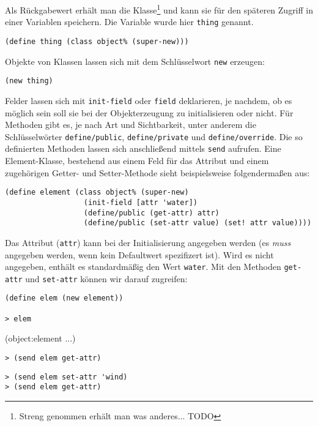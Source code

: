 Als Rückgabewert erhält man die Klasse\footnote{Streng genommen erhält man was anderes... TODO} %
und kann sie für den späteren Zugriff in einer Variablen speichern. Die Variable wurde hier \texttt{thing} genannt.

\begin{lstlisting}
(define thing (class object% (super-new)))
\end{lstlisting}

Objekte von Klassen lassen sich mit dem Schlüsselwort \texttt{new} erzeugen:

\begin{lstlisting}
(new thing)
\end{lstlisting}

Felder lassen sich mit \texttt{init-field} oder \texttt{field} deklarieren, je nachdem, ob es möglich sein soll sie bei der Objekterzeugung zu initialisieren oder nicht. Für Methoden gibt es, je nach Art und Sichtbarkeit, unter anderem die Schlüsselwörter \texttt{define/public}, \texttt{define/private} und \texttt{define/override}. Die so definierten Methoden lassen sich anschließend mittels \texttt{send} aufrufen. Eine Element-Klasse, bestehend aus einem Feld für das Attribut und einem zugehörigen Getter- und Setter-Methode sieht beispielsweise folgendermaßen aus:

\begin{lstlisting}
(define element (class object% (super-new)
                  (init-field [attr 'water])
                  (define/public (get-attr) attr)
                  (define/public (set-attr value) (set! attr value))))  
\end{lstlisting}

Das Attribut (\texttt{attr}) kann bei der Initialisierung angegeben werden (es \emph{muss} angegeben werden, wenn kein Defaultwert spezifizert ist). Wird es nicht angegeben, enthält es standardmäßig den Wert \texttt{{\textquotesingle}water}. Mit den Methoden \texttt{get-attr} und \texttt{set-attr} können wir darauf zugreifen:

\begin{lstlisting}
(define elem (new element))

> elem
\end{lstlisting} 
{\routput (object:element ...)}

\begin{lstlisting}
> (send elem get-attr)
\end{lstlisting} 
{}

\begin{lstlisting}
> (send elem set-attr 'wind)
> (send elem get-attr)
\end{lstlisting} 
{}

